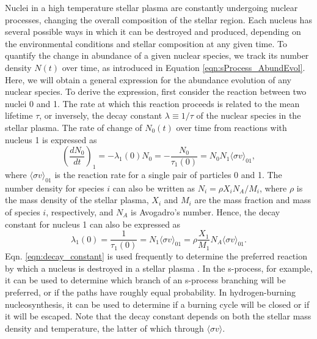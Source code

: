 Nuclei in a high temperature stellar plasma are constantly undergoing nuclear processes, changing the overall composition of the stellar region. Each nucleus has several possible ways in which it can be destroyed and produced, depending on the environmental conditions and stellar composition at any given time. To quantify the change in abundance of a given nuclear species, we track its number density $N(t)$ over time, as introduced in Equation \ref{eqn:sProcess_AbundEvol}. Here, we will obtain a general expression for the abundance evolution of any nuclear species. To derive the expression, first consider the reaction between two nuclei 0 and 1. The rate at which this reaction proceeds is related to the mean lifetime $\tau$, or inversely, the decay constant $\lambda \equiv 1/\tau$ of the nuclear species in the stellar plasma. The rate of change of $N_{0}(t)$ over time from reactions with nucleus 1 is expressed as
\begin{equation} \label{eqn:AbundEvol_01}
\left( \frac{dN_{0}}{dt} \right)_{1} = -\lambda_{1}(0)N_{0} = - \frac{N_{0}}{\tau_{1}(0)} = N_{0}N_{1}\langle \sigma v \rangle_{01},
\end{equation}
where $\langle \sigma v \rangle_{01}$ is the reaction rate for a single pair of particles 0 and 1. The number density for species $i$ can also be written as $N_{i} = \rho X_{i} N_{A} / M_{i}$, where $\rho$ is the mass density of the stellar plasma, $X_{i}$ and $M_{i}$ are the mass fraction and mass of species $i$, respectively, and $N_{A}$ is Avogadro's number. Hence, the decay constant for nucleus 1 can also be expressed as
\begin{equation} \label{eqn:decay_constant}
\lambda_{1}(0) = \frac{1}{\tau_{1}(0)} = N_{1} \langle \sigma v \rangle_{01} = \rho \frac{X_{1}}{M_{1}} N_{A} \langle \sigma v \rangle_{01}.
\end{equation}
Eqn. \ref{eqn:decay_constant} is used frequently to determine the preferred reaction by which a nucleus is destroyed in a stellar plasma \cite{Iliadis2015}. In the s-process, for example, it can be used to determine which branch of an s-process branching will be preferred, or if the paths have roughly equal probability. In hydrogen-burning nucleosynthesis, it can be used to determine if a burning cycle will be closed or if it will be escaped. Note that the decay constant depends on both the stellar mass density and temperature, the latter of which through $\langle \sigma v \rangle$.


